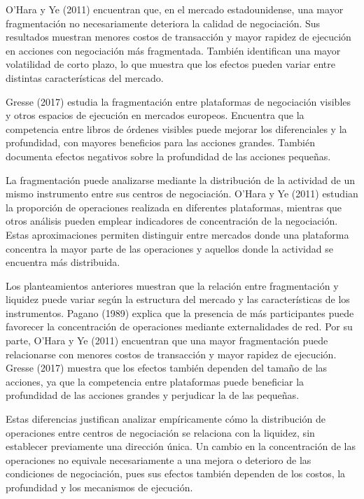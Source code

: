 O'Hara y Ye (2011) encuentran que, en el mercado estadounidense, una mayor fragmentación no necesariamente deteriora la calidad de negociación. Sus resultados muestran menores costos de transacción y mayor rapidez de ejecución en acciones con negociación más fragmentada. También identifican una mayor volatilidad de corto plazo, lo que muestra que los efectos pueden variar entre distintas características del mercado.

Gresse (2017) estudia la fragmentación entre plataformas de negociación visibles y otros espacios de ejecución en mercados europeos. Encuentra que la competencia entre libros de órdenes visibles puede mejorar los diferenciales y la profundidad, con mayores beneficios para las acciones grandes. También documenta efectos negativos sobre la profundidad de las acciones pequeñas.

La fragmentación puede analizarse mediante la distribución de la actividad de un mismo instrumento entre sus centros de negociación. O'Hara y Ye (2011) estudian la proporción de operaciones realizada en diferentes plataformas, mientras que otros análisis pueden emplear indicadores de concentración de la negociación. Estas aproximaciones permiten distinguir entre mercados donde una plataforma concentra la mayor parte de las operaciones y aquellos donde la actividad se encuentra más distribuida.

Los planteamientos anteriores muestran que la relación entre fragmentación y liquidez puede variar según la estructura del mercado y las características de los instrumentos. Pagano (1989) explica que la presencia de más participantes puede favorecer la concentración de operaciones mediante externalidades de red. Por su parte, O'Hara y Ye (2011) encuentran que una mayor fragmentación puede relacionarse con menores costos de transacción y mayor rapidez de ejecución. Gresse (2017) muestra que los efectos también dependen del tamaño de las acciones, ya que la competencia entre plataformas puede beneficiar la profundidad de las acciones grandes y perjudicar la de las pequeñas.

Estas diferencias justifican analizar empíricamente cómo la distribución de operaciones entre centros de negociación se relaciona con la liquidez, sin establecer previamente una dirección única. Un cambio en la concentración de las operaciones no equivale necesariamente a una mejora o deterioro de las condiciones de negociación, pues sus efectos también dependen de los costos, la profundidad y los mecanismos de ejecución.

